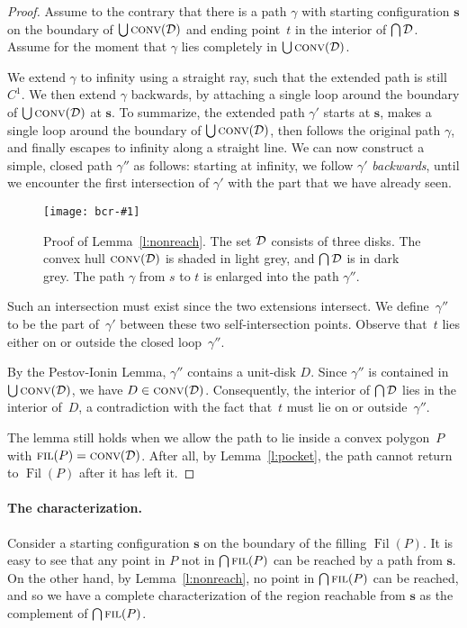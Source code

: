 \documentclass[a4paper]{article}
\newcommand{\DD}{{\cal D}}
\newcommand{\vecs}{{\mathbf{s}}}
\DeclareMathOperator{\FIL}{\textsc{fil}}
\DeclareMathOperator{\fil}{Fil}
\DeclareMathOperator{\conv}{\textsc{conv}}
\newcommand{\epsfigure}[2]{
  \begin{figure}[htb]
    \centerline{\texttt{[image: bcr-\#1]}}
    \caption{#2}
    \label{f:#1}
  \end{figure}}
\begin{document}
\begin{proof}
  Assume to the contrary that there is a path $\gamma$ with starting
  configuration $\vecs$ on the boundary of $\bigcup\conv(\DD)$ and
  ending point~$t$ in the interior of $\bigcap \DD$.  Assume for the
  moment that $\gamma$ lies completely in $\bigcup\conv(\DD)$.  
  
  We extend $\gamma$ to infinity using a straight ray, such that the
  extended path is still $C^{1}$.  We then extend $\gamma$ backwards,
  by attaching a single loop around the boundary of
  $\bigcup\conv(\DD)$ at $\vecs$. To summarize, the extended path
  $\gamma'$ starts at $\vecs$, makes a single loop around the boundary
  of $\bigcup\conv(\DD)$, then follows the original path $\gamma$, and
  finally escapes to infinity along a straight line.  We can now
  construct a simple, closed path $\gamma''$ as follows: starting at
  infinity, we follow $\gamma'$ \emph{backwards}, until we encounter
  the first intersection of $\gamma'$ with the part that we have
  already seen.  
\epsfigure{udisks}{Proof of Lemma~\ref{l:nonreach}. The set $\DD$
    consists of three disks. The convex hull $\conv(\DD)$ is shaded in
    light grey, and $\bigcap \DD$ is in dark grey.  The path $\gamma$ from
    $s$ to $t$ is enlarged into the path $\gamma''$.}
Such an intersection must exist since the two
  extensions intersect.  We define~$\gamma''$ to be the part of~$\gamma'$
  between these two self-intersection points.
  Observe that~$t$ lies either on or outside the closed loop~$\gamma''$.
  
  By the Pestov-Ionin Lemma, $\gamma''$ contains a unit-disk $D$. 
  Since $\gamma''$ is contained in $\bigcup\conv(\DD)$, we have $D \in
  \conv(\DD)$. Consequently, the interior of $\bigcap \DD$ lies in the
  interior of~$D$, a contradiction with the fact that~$t$ must lie
  on or outside~$\gamma''$.

  The lemma still holds when we allow the path to lie inside a convex
  polygon~$P$ with $\FIL(P) = \conv(\DD)$.  After all, by
  Lemma~\ref{l:pocket}, the path cannot return to $\fil(P)$ after it
  has left it.
\end{proof}

\paragraph{The characterization.}
Consider a starting configuration $\vecs$ on the boundary of the
filling $\fil(P)$.  It is easy to see that any point in $P$ not in
$\bigcap \FIL(P)$ can be reached by a path from $\vecs$.  On the other
hand, by Lemma~\ref{l:nonreach}, no point in $\bigcap \FIL(P)$
can be reached, and so we have a complete characterization of the
region reachable from $\vecs$ as the complement of $\bigcap \FIL(P)$.
\end{document}
